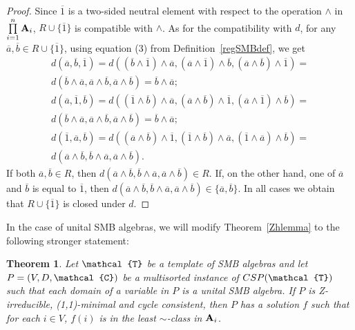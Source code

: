 \documentclass[11pt]{amsart}
\newcommand{\m}[1]{{\uppercase {\mathbf {#1}}}}
\newcommand{\vr}[1]{{\uppercase {\mathcal{#1}}}}
\newcommand{\mt}{\wedge}
\newtheorem{thm}{Theorem}[section]
\theoremstyle{definition}
\begin{document}
\begin{proof}
Since $\overline{1}$ is a two-sided neutral element with respect to the operation $\mt$ in $\prod\limits_{i=1}^n\m a_i$, $R\cup\{\overline{1}\}$ is compatible with $\mt$. As for the compatibility with $d$, for any $\overline{a},\overline{b}\in R\cup\{\overline{1}\}$, using equation (3) from Definition~\ref{regSMBdef}, we get
\[
\begin{gathered}
d(\overline{a},\overline{b},\overline{1})=d((\overline{b}\mt\overline{1})\mt\overline{a},(\overline{a}\mt\overline{1})\mt\overline{b},(\overline{a}\mt\overline{b})\mt\overline{1})=\\
d(\overline{b}\mt\overline{a},\overline{a}\mt\overline{b},\overline{a}\mt\overline{b})=\overline{b}\mt\overline{a};\\
d(\overline{a},\overline{1},\overline{b})=d((\overline{1}\mt\overline{b})\mt\overline{a},(\overline{a}\mt\overline{b})\mt\overline{1},(\overline{a}\mt\overline{1})\mt\overline{b})=\\
d(\overline{b}\mt\overline{a},\overline{a}\mt\overline{b},\overline{a}\mt\overline{b})=\overline{b}\mt\overline{a};\\
d(\overline{1},\overline{a},\overline{b})=d((\overline{a}\mt\overline{b})\mt\overline{1},(\overline{1}\mt\overline{b})\mt\overline{a},(\overline{1}\mt\overline{a})\mt\overline{b})=\\
d(\overline{a}\mt\overline{b},\overline{b}\mt\overline{a},\overline{a}\mt\overline{b}).
\end{gathered}
\]
If both $\overline{a},\overline{b}\in R$, then $d(\overline{a}\mt\overline{b},\overline{b}\mt\overline{a},\overline{a}\mt\overline{b})\in R$. If, on the other hand, one of $\overline{a}$ and $\overline{b}$ is equal to $\overline{1}$, then $d(\overline{a}\mt\overline{b},\overline{b}\mt\overline{a},\overline{a}\mt\overline{b})\in\{\overline{a},\overline{b}\}$. In all cases we obtain that $R\cup\{\overline{1}\}$ is closed under $d$.
\end{proof}

In the case of unital SMB algebras, we will modify Theorem~\ref{Zhlemma} to the following stronger statement:

\begin{thm}\label{Aljareduce}
Let $\vr t$ be a template of SMB algebras and let $P=(V,D,\vr c)$ be a multisorted instance of $CSP(\vr t)$ such that each domain of a variable in $P$ is a unital SMB algebra. If $P$ is Z-irreducible, (1,1)-minimal and cycle consistent, then $P$ has a solution $f$ such that for each $i\in V$, $f(i)$ is in the least $\sim$-class in $\m a_i$.
\end{thm}
\end{document}
